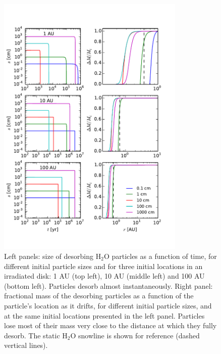\documentclass[apj]{emulateapj}
\begin{document}
\begin{figure}[t!]
\centering
\includegraphics[width=0.8\textwidth]{s_t_a.pdf}
\caption{Left panels: size of desorbing H$_2$O particles as a function of time, for different initial particle sizes and for three initial locations in an irradiated disk: 1 AU (top left), 10 AU (middle left) and 100 AU (bottom left). Particles desorb almost instantaneously. Right panel: fractional mass of the desorbing particles as a function of the particle's location as it drifts, for different initial particle sizes, and at the same initial locations presented in the left panel. Particles lose most of their mass very close to the distance at which they fully desorb. The static H$_2$O snowline is shown for reference (dashed vertical lines).}
\label{fig:s_t_a}
\end{figure}
\end{document}
